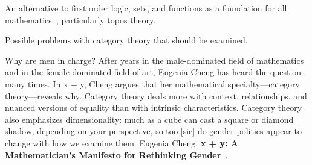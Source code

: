 \documentclass[11pt,openany]{book}
\begin{document}
An alternative to first order logic, sets, 
and functions as a foundation for all
mathematics~\cite{feferman_1977_categorical},  
particularly topos theory.


\setcounter{currentlevel}{\value{baseSectionLevel}}
\label{sec:Doubts}

Possible problems with category theory that should be examined.


\label{sec:Hype}

\begin{boxquote}
Why are men in charge? 
After years in the male-dominated field of mathematics 
and in the female-dominated field of art, 
Eugenia Cheng has heard the question many times. 
In x + y, Cheng argues that her mathematical 
specialty---category theory---reveals why. 
Category theory deals more with context, relationships, 
and nuanced versions of equality than 
with intrinsic characteristics. 
Category theory also emphasizes dimensionality: 
much as a cube can cast a square or diamond shadow, 
depending on your perspective, 
so too [sic] do gender politics appear to change 
with how we examine them. 
\tcblower
{Eugenia Cheng, \textbf{x + y:
A Mathematician’s Manifesto for Rethinking 
Gender}~\cite{cheng_2020_about}.}
\end{boxquote}
\end{document}
